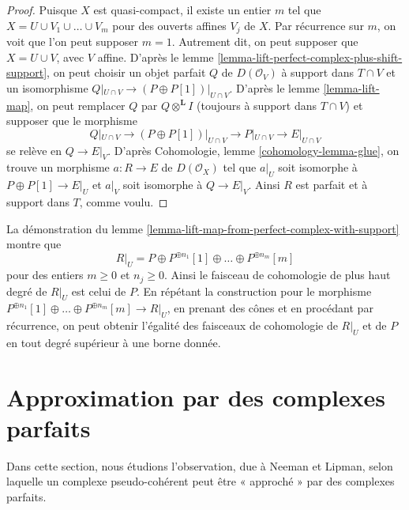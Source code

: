 \begin{proof}
Puisque $X$ est quasi-compact, il existe un entier $m$ tel que
$X = U \cup V_1 \cup \ldots \cup V_m$ pour des ouverts affines $V_j$ de $X$.
Par récurrence sur $m$, on voit que l'on peut supposer $m = 1$. Autrement
dit, on peut supposer que $X = U \cup V$, avec $V$ affine. D'après le
lemme \ref{lemma-lift-perfect-complex-plus-shift-support},
on peut choisir un objet parfait $Q$ de $D(\mathcal{O}_V)$
à support dans $T \cap V$ et un isomorphisme
$Q|_{U \cap V} \to (P \oplus P[1])|_{U \cap V}$.
D'après le lemme \ref{lemma-lift-map}, on peut remplacer $Q$ par
$Q \otimes^\mathbf{L} I$ (toujours à support dans $T \cap V$)
et supposer que le morphisme
$$
Q|_{U \cap V} \to (P \oplus P[1])|_{U \cap V}
\longrightarrow P|_{U \cap V}
\longrightarrow
E|_{U \cap V}
$$
se relève en $Q \to E|_V$. D'après
Cohomologie, lemme \ref{cohomology-lemma-glue},
on trouve un morphisme $a : R \to E$ de $D(\mathcal{O}_X)$
tel que $a|_U$ soit isomorphe à $P \oplus P[1] \to E|_U$
et $a|_V$ soit isomorphe à $Q \to E|_V$.
Ainsi $R$ est parfait et à support dans $T$, comme voulu.
\end{proof}

\begin{remark}
\label{remark-addendum}
La démonstration du lemme \ref{lemma-lift-map-from-perfect-complex-with-support}
montre que
$$
R|_U = P \oplus P^{\oplus n_1}[1] \oplus \ldots \oplus P^{\oplus n_m}[m]
$$
pour des entiers $m \geq 0$ et $n_j \geq 0$. Ainsi le faisceau de cohomologie
de plus haut degré de $R|_U$ est celui de $P$. En répétant la construction pour le morphisme
$P^{\oplus n_1}[1] \oplus \ldots \oplus P^{\oplus n_m}[m] \to R|_U$, en prenant
des cônes et en procédant par récurrence, on peut obtenir l'égalité des faisceaux de cohomologie
de $R|_U$ et de $P$ en tout degré supérieur à une borne donnée.
\end{remark}



\section{Approximation par des complexes parfaits}
\label{section-approximation}

\noindent
Dans cette section, nous étudions l'observation, due à Neeman et Lipman,
selon laquelle un complexe pseudo-cohérent peut être « approché » par des complexes parfaits.

